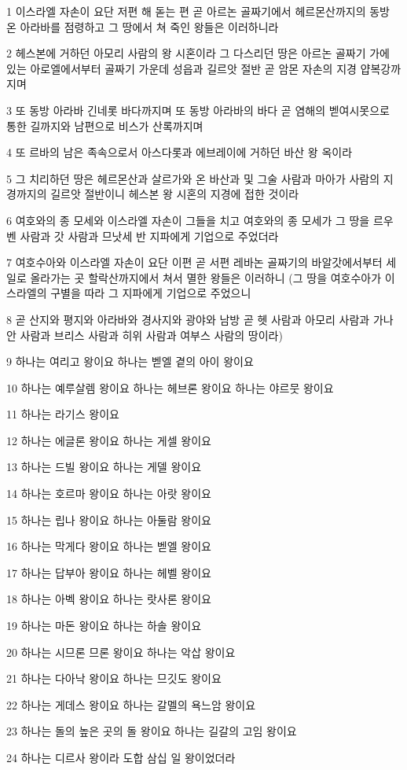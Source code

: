 \par 1 이스라엘 자손이 요단 저편 해 돋는 편 곧 아르논 골짜기에서 헤르몬산까지의 동방 온 아라바를 점령하고 그 땅에서 쳐 죽인 왕들은 이러하니라
\par 2 헤스본에 거하던 아모리 사람의 왕 시혼이라 그 다스리던 땅은 아르논 골짜기 가에 있는 아로엘에서부터 골짜기 가운데 성읍과 길르앗 절반 곧 암몬 자손의 지경 얍복강까지며
\par 3 또 동방 아라바 긴네롯 바다까지며 또 동방 아라바의 바다 곧 염해의 벧여시못으로 통한 길까지와 남편으로 비스가 산록까지며
\par 4 또 르바의 남은 족속으로서 아스다롯과 에브레이에 거하던 바산 왕 옥이라
\par 5 그 치리하던 땅은 헤르몬산과 살르가와 온 바산과 및 그술 사람과 마아가 사람의 지경까지의 길르앗 절반이니 헤스본 왕 시혼의 지경에 접한 것이라
\par 6 여호와의 종 모세와 이스라엘 자손이 그들을 치고 여호와의 종 모세가 그 땅을 르우벤 사람과 갓 사람과 므낫세 반 지파에게 기업으로 주었더라
\par 7 여호수아와 이스라엘 자손이 요단 이편 곧 서편 레바논 골짜기의 바알갓에서부터 세일로 올라가는 곳 할락산까지에서 쳐서 멸한 왕들은 이러하니 (그 땅을 여호수아가 이스라엘의 구별을 따라 그 지파에게 기업으로 주었으니
\par 8 곧 산지와 평지와 아라바와 경사지와 광야와 남방 곧 헷 사람과 아모리 사람과 가나안 사람과 브리스 사람과 히위 사람과 여부스 사람의 땅이라)
\par 9 하나는 여리고 왕이요 하나는 벧엘 곁의 아이 왕이요
\par 10 하나는 예루살렘 왕이요 하나는 헤브론 왕이요 하나는 야르뭇 왕이요
\par 11 하나는 라기스 왕이요
\par 12 하나는 에글론 왕이요 하나는 게셀 왕이요
\par 13 하나는 드빌 왕이요 하나는 게델 왕이요
\par 14 하나는 호르마 왕이요 하나는 아랏 왕이요
\par 15 하나는 립나 왕이요 하나는 아둘람 왕이요
\par 16 하나는 막게다 왕이요 하나는 벧엘 왕이요
\par 17 하나는 답부아 왕이요 하나는 헤벨 왕이요
\par 18 하나는 아벡 왕이요 하나는 랏사론 왕이요
\par 19 하나는 마돈 왕이요 하나는 하솔 왕이요
\par 20 하나는 시므론 므론 왕이요 하나는 악삽 왕이요
\par 21 하나는 다아낙 왕이요 하나는 므깃도 왕이요
\par 22 하나는 게데스 왕이요 하나는 갈멜의 욕느암 왕이요
\par 23 하나는 돌의 높은 곳의 돌 왕이요 하나는 길갈의 고임 왕이요
\par 24 하나는 디르사 왕이라 도합 삼십 일 왕이었더라

